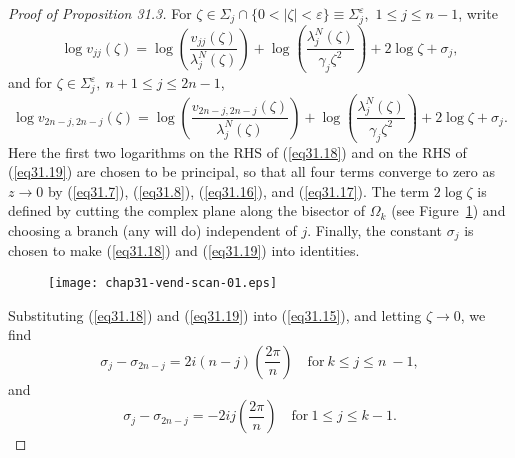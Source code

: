 \documentclass{surv-l}
\theoremstyle{plain}
\theoremstyle{definition}
\numberwithin{equation}{chapter}
\begin{document}
\begin{proof}[Proof of Proposition 31.3]
For $\zeta \in{\Sigma}_{j}\cap\{0<|\zeta|<\varepsilon \} \equiv{\Sigma}_{j}^{\varepsilon}$,\ $1\leq j\leq n-1$, write
\begin{equation}\label{eq31.18}
\log v_{jj}(\zeta)=\log\left(\frac{v_{jj}(\zeta)}{\lambda_{j}^{N}(\zeta)}\right)+\log\left(\frac{\lambda_{j}^{N}(\zeta)}{\gamma_{j}\zeta^{2}}\right)+2\log\zeta+\sigma_{j},
\end{equation}
and for $\zeta\in\Sigma_{j}^{\varepsilon},\ n +1\leq j\leq 2n-1$,
\begin{equation}\label{eq31.19}
\displaystyle \log v_{2n-j, 2n-j}(\zeta)=\log\left(\frac{v_{2n-j, 2n-j}(\zeta)}{\lambda_{j}^{N}(\zeta)}\right)+\log\left(\frac{\lambda_{j}^{N}(\zeta)}{\gamma_{j}\zeta^{2}}\right)+2\log\zeta+\sigma_{j}.
\end{equation}
Here the first two logarithms on the RHS of (\ref{eq31.18}) and on the RHS of (\ref{eq31.19}) are chosen to be principal, so that all four terms converge to zero as $z\rightarrow 0$ by (\ref{eq31.7}), (\ref{eq31.8}), (\ref{eq31.16}), and (\ref{eq31.17}). The term $ 2\log\zeta$ is defined by cutting the complex plane along the bisector of $\Omega_{k}$ (see Figure~\ref{fig10}) and choosing a branch (any will do) independent of $j$. Finally, the constant $\sigma_{j}$ is chosen to make (\ref{eq31.18}) and (\ref{eq31.19}) into identities.

\begin{figure}
\texttt{[image: chap31-vend-scan-01.eps]}
\caption{ }\label{fig10}
\end{figure}

Substituting (\ref{eq31.18}) and (\ref{eq31.19}) into (\ref{eq31.15}),   and letting $\zeta\rightarrow 0$, we find
\begin{equation}\label{eq31.20}
\sigma_{j}-\sigma_{2n-j}=2i(n-j)\left(\frac{2\pi}{n}\right)\quad \mathrm{for}\ k\leq j\leq n\ -1,
\end{equation}
and
\begin{equation}\label{eq31.21}
\sigma_{j}-\sigma_{2n-j}=-2ij\left(\frac{2\pi}{n}\right)\quad \mathrm{for}\ 1\leq j\leq k-1.
\end{equation}


\end{proof}
\end{document}
